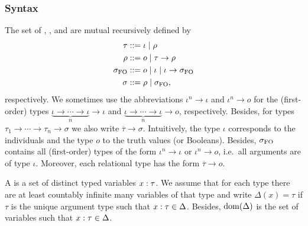 \documentclass[a4paper,twoside,notitlepage,openright,11pt]{report}
\begin{document}
\subsubsection{Syntax}
The set of , ,  and  are mutual recursively defined by
\begin{align*}
  \tau&::=\iota\mid\rho\\
  \rho&::= o\mid\tau\to\rho\\
  \sigma_{\operatorname{{FO}}}&::=o\mid\iota\mid\iota\to\sigma_{\operatorname{{FO}}}\\
  \sigma&::=\rho\mid\sigma_{\operatorname{{FO}}},
\end{align*}
respectively. We sometimes use the abbreviations $\iota^n\to\iota$ and $\iota^n\to o$ for the (first-order) types $\underbrace{\iota\to\cdots\to\iota}_{n}\to\iota$ and $\underbrace{\iota\to\cdots\to\iota}_{n}\to o$, respectively. Besides, for types $\tau_1\to\cdots\to\tau_n\to\sigma$ we also write $\overline\tau\to\sigma$. Intuitively, the type $\iota$ corresponds to the individuals and the type $o$ to the truth values (or Booleans). Besides, $\sigma_{\operatorname{{FO}}}$ contains all (first-order) types of the form $\iota^n\to\iota$ or $\iota^n\to o$, i.e.\ all arguments are of type $\iota$. Moreover, each relational type has the form $\overline\tau\to o$.

A  is a set of distinct typed variables $x:\tau$. We assume that for each type there are at least countably infinite many variables of that type and write $\Delta(x)=\tau$ if $\tau$ is the unique argument type such that $x:\tau\in\Delta$. Besides, $\operatorname{dom}(\Delta)$ is the set of variables such that $x:\tau\in\Delta$. 
\end{document}
